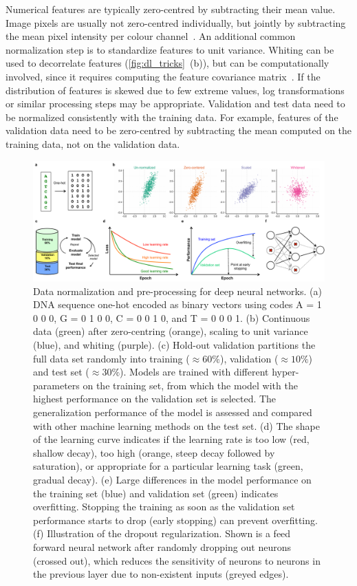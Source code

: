 Numerical features are typically zero-centred by subtracting their mean value. Image pixels are usually not zero-centred individually, but jointly by subtracting the mean pixel intensity per colour channel~\citep{karpathy_cs231n_2016}. An additional common normalization step is to standardize features to unit variance. Whiting can be used to decorrelate features (\autoref{fig:dl_tricks}~(b)), but can be computationally involved, since it requires computing the feature covariance matrix~\citep{hastie_elements_2005}. If the distribution of features is skewed due to few extreme values, log transformations or similar processing steps may be appropriate. Validation and test data need to be normalized consistently with the training data. For example, features of the validation data need to be zero-centred by subtracting the mean computed on the training data, not on the validation data.

\begin{figure}[htbp!]
\centering
\includegraphics[width=1.0\textwidth]{tricks}
\caption[Data normalization and pre-processing for deep neural networks.]{Data normalization and pre-processing for deep neural networks. (a) DNA sequence one-hot encoded as binary vectors using codes A = 1 0 0 0, G = 0 1 0 0, C = 0 0 1 0, and T = 0 0 0 1. (b) Continuous data (green) after zero-centring (orange), scaling to unit variance (blue), and whiting (purple). (c) Hold-out validation partitions the full data set randomly into training (${\approx}60\%$), validation (${\approx}10\%$) and test set (${\approx}30\%$). Models are trained with different hyper-parameters on the training set, from which the model with the highest performance on the validation set is selected. The generalization performance of the model is assessed and compared with other machine learning methods on the test set. (d) The shape of the learning curve indicates if the learning rate is too low (red, shallow decay), too high (orange, steep decay followed by saturation), or appropriate for a particular learning task (green, gradual decay). (e) Large differences in the model performance on the training set (blue) and validation set (green) indicates overfitting. Stopping the training as soon as the validation set performance starts to drop (early stopping) can prevent overfitting. (f) Illustration of the dropout regularization. Shown is a feed forward neural network after randomly dropping out neurons (crossed out), which reduces the sensitivity of neurons to neurons in the previous layer due to non-existent inputs (greyed edges).}
\label{fig:dl_tricks}
\end{figure}

